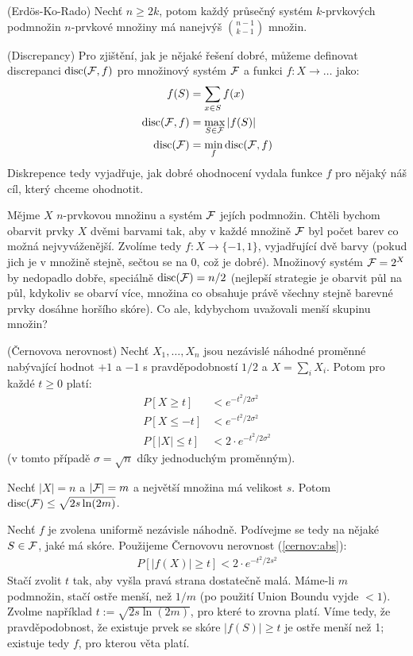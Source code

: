 \vt (Erdös-Ko-Rado) Nechť $n \geq 2k$, potom každý průsečný systém
$k$-prvkových podmnožin $n$-prvkové množiny má nanejvýš $\binom{n-1}{k-1}$
množin.

\df (Discrepancy) Pro zjištění, jak je nějaké řešení dobré, můžeme definovat
discrepanci $\operatorname{disc}(\mathcal{F},f)$ pro množinový systém $\mathcal{F}$ a funkci $f: X \to \dots$
jako:
\begin{align}
	f(S) &= \sum_{x\in S} f(x) \\
	\operatorname{disc}(\mathcal{F},f) &= \max_{S\in \mathcal{F}} |f(S)| \\
	\operatorname{disc}(\mathcal{F}) &= \min_f \operatorname{disc}(\mathcal{F},f)
\end{align}
Diskrepence tedy vyjadřuje, jak dobré ohodnocení vydala funkce $f$ pro nějaký
náš cíl, který chceme ohodnotit.

\app Mějme $X$ $n$-prvkovou množinu a systém $\mathcal{F}$ jejích podmnožin. Chtěli
bychom obarvit prvky $X$ dvěmi barvami tak, aby v každé množině $\mathcal{F}$ byl počet
barev co možná nejvyváženější. Zvolíme tedy $f: X \to \{-1, 1\}$, vyjadřující
dvě barvy (pokud jich je v množině stejně, sečtou se na 0, což je dobré).
Množinový systém $\mathcal{F} = 2^X$ by nedopadlo dobře, speciálně $\operatorname{disc}(\mathcal{F}) = n/2$
(nejlepší strategie je obarvit půl na půl, kdykoliv se obarví více, množina co
obsahuje právě všechny stejně barevné prvky dosáhne horšího skóre). Co ale,
kdybychom uvažovali menší skupinu množin?

\tv (Černovova nerovnost) Nechť $X_1, \dots, X_n$ jsou nezávislé náhodné
proměnné nabývající hodnot $+1$ a $-1$ s pravděpodobností $1/2$ a $X = \sum_i
X_i$. Potom pro každé $t \geq 0$ platí:
\begin{align}
	P[X \geq t] &< e^{-t^2/2\sigma^2} \\
	P[X \leq -t] &< e^{-t^2/2\sigma^2}\\
	\label{cernov:abs} P[|X| \leq t] &< 2\cdot e^{-t^2/2\sigma^2}
\end{align}
(v tomto případě $\sigma = \sqrt{n}$ díky jednoduchým proměnným).


\tv Nechť $|X|=n$ a $|\mathcal{F}| = m$ a největší množina má velikost $s$.  Potom
$\operatorname{disc}(\mathcal{F}) \leq \sqrt{2s\ln(2m)}$.

\dk Nechť $f$ je zvolena uniformě nezávisle náhodně. Podívejme se tedy na nějaké
$S \in \mathcal{F}$, jaké má skóre. Použijeme Černovovu nerovnost (\ref{cernov:abs}):
\begin{align}
	P[|f(X)| \geq t] < 2 \cdot e^{-t^2/2s^2}
\end{align}
Stačí zvolit $t$ tak, aby vyšla pravá strana dostatečně malá. Máme-li $m$
podmnožin, stačí ostře menší, než $1/m$ (po použití Union Boundu vyjde $< 1$).
Zvolme například $t := \sqrt{2s\ln(2m)}$, pro které to zrovna platí. Víme tedy,
že pravděpodobnost, že existuje prvek se skóre $|f(S)| \geq t$ je ostře menší
než 1; existuje tedy $f$, pro kterou věta platí.

